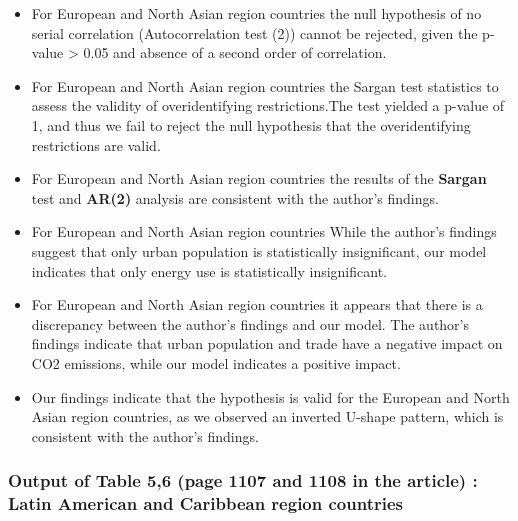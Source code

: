 \documentclass[
  11pt,
]{article}
\begin{document}
\begin{itemize}
\item
  For European and North Asian region countries the null hypothesis of
  no serial correlation (Autocorrelation test (2)) cannot be rejected,
  given the p-value \textgreater{} 0.05 and absence of a second order of
  correlation.
\item
  For European and North Asian region countries the Sargan test
  statistics to assess the validity of overidentifying restrictions.The
  test yielded a p-value of 1, and thus we fail to reject the null
  hypothesis that the overidentifying restrictions are valid.
\item
  For European and North Asian region countries the results of the
  \textbf{Sargan} test and \textbf{AR(2)} analysis are consistent with
  the author's findings.
\item
  For European and North Asian region countries While the author's
  findings suggest that only urban population is statistically
  insignificant, our model indicates that only energy use is
  statistically insignificant.
\item
  For European and North Asian region countries it appears that there is
  a discrepancy between the author's findings and our model. The
  author's findings indicate that urban population and trade have a
  negative impact on CO2 emissions, while our model indicates a positive
  impact.
\item
  Our findings indicate that the hypothesis is valid for the European
  and North Asian region countries, as we observed an inverted U-shape
  pattern, which is consistent with the author's findings.
\end{itemize}

\hypertarget{output-of-table-56-page-1107-and-1108-in-the-article-latin-american-and-caribbean-region-countries}{%
\subsubsection{Output of Table 5,6 (page 1107 and 1108 in the article) :
Latin American and Caribbean region
countries}\label{output-of-table-56-page-1107-and-1108-in-the-article-latin-american-and-caribbean-region-countries}}
\end{document}
